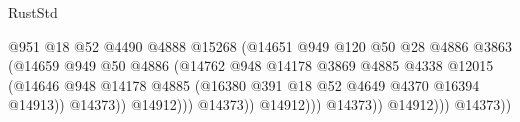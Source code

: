\begin{lexlean}{RustStd}
\begin{coremodule}
                                                    @951
                                                    @18
                                                    @52
                                                    @4490
                                                    @4888
                                                    @15268
                                                    (@14651
                                                      @949
                                                      @120
                                                      @50
                                                      @28
                                                      @4886
                                                      @3863
                                                      (@14659
                                                        @949
                                                        @50
                                                        @4886
                                                        (@14762
                                                          @948
                                                          @14178
                                                          @3869
                                                          @4885
                                                          @4338
                                                          @12015
                                                          (@14646
                                                            @948
                                                            @14178
                                                            @4885
                                                            (@16380
                                                              @391
                                                              @18
                                                              @52
                                                              @4649
                                                              @4370
                                                              @16394
                                                              @14913))
                                                          @14373))
                                                      @14912)))
                                                @14373))
                                            @14912)))
                                      @14373))
                                  @14912)))
                            @14373))

\end{coremodule}
\end{lexlean}

